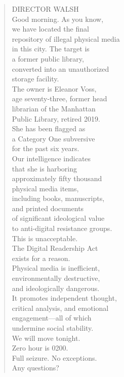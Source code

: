\documentclass[
    language=english,
    doctype=screenplay,
    institution=none,
]{../../omnilatex}
\begin{document}
\begin{quote}
DIRECTOR WALSH\\
Good morning. As you know,\\
we have located the final\\
repository of illegal physical media\\
in this city. The target is\\
a former public library,\\
converted into an unauthorized\\
storage facility.\\[0.3cm]
The owner is Eleanor Voss,\\
age seventy-three, former head\\
librarian of the Manhattan\\
Public Library, retired 2019.\\
She has been flagged as\\
a Category One subversive\\
for the past six years.\\[0.3cm]
Our intelligence indicates\\
that she is harboring\\
approximately fifty thousand\\
physical media items,\\
including books, manuscripts,\\
and printed documents\\
of significant ideological value\\
to anti-digital resistance groups.\\[0.3cm]
This is unacceptable.\\
The Digital Readership Act\\
exists for a reason.\\
Physical media is inefficient,\\
environmentally destructive,\\
and ideologically dangerous.\\
It promotes independent thought,\\
critical analysis, and emotional\\
engagement---all of which\\
undermine social stability.\\[0.3cm]
We will move tonight.\\
Zero hour is 0200.\\
Full seizure. No exceptions.\\
Any questions?
\end{quote}
\end{document}

